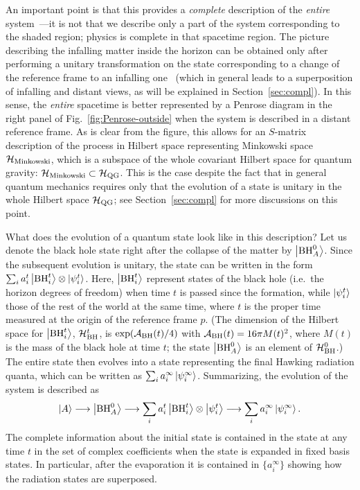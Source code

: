 \documentclass[12pt]{article}
\begin{document}
An important point is that this provides a {\it complete} description 
of the {\it entire} system~\cite{'tHooft:1990fr,Susskind:1993if}---it 
is not that we describe only a part of the system corresponding to 
the shaded region; physics is complete in that spacetime region.  The 
picture describing the infalling matter inside the horizon can be obtained 
only after performing a unitary transformation on the state corresponding 
to a change of the reference frame to an infalling one~\cite{Nomura:2011rb} 
(which in general leads to a superposition of infalling and distant views, 
as will be explained in Section~\ref{sec:compl}).  In this sense, the 
{\it entire} spacetime is better represented by a Penrose diagram in the 
right panel of Fig.~\ref{fig:Penrose-outside} when the system is described 
in a distant reference frame.  As is clear from the figure, this allows 
for an $S$-matrix description of the process in Hilbert space representing 
Minkowski space ${\cal H}_{\rm Minkowski}$, which is a subspace of the 
whole covariant Hilbert space for quantum gravity: ${\cal H}_{\rm Minkowski} 
\subset {\cal H}_{\rm QG}$.  This is the case despite the fact that 
in general quantum mechanics requires only that the evolution of a 
state is unitary in the whole Hilbert space ${\cal H}_{\rm QG}$; see 
Section~\ref{sec:compl} for more discussions on this point.

What does the evolution of a quantum state look like in this description? 
Let us denote the black hole state right after the collapse of the matter 
by $\left| {\rm BH}^0_A \right>$.  Since the subsequent evolution is unitary, 
the state can be written in the form $\sum_i a^t_i \left| {\rm BH}^t_i \right> 
\otimes \left| \psi^t_i \right>$.  Here, $\left| {\rm BH}^t_i \right>$ represent states 
of the black hole (i.e.\ the horizon degrees of freedom) when time $t$ 
is passed since the formation, while $\left| \psi^t_i \right>$ those of the rest 
of the world at the same time, where $t$ is the proper time measured 
at the origin of the reference frame $p$.  (The dimension of the 
Hilbert space for $\left| {\rm BH}^t_i \right>$, ${\cal H}_{\rm BH}^t$, is 
$\exp({\cal A}_{\rm BH}(t)/4)$ with ${\cal A}_{\rm BH}(t) = 16\pi M(t)^2$, 
where $M(t)$ is the mass of the black hole at time $t$; the state 
$\left| {\rm BH}^0_A \right>$ is an element of ${\cal H}_{\rm BH}^0$.) 
The entire state then evolves into a state representing the final 
Hawking radiation quanta, which can be written as $\sum_i a^\infty_i 
\left| \psi^\infty_i \right>$.  Summarizing, the evolution of the system is 
described as
%
\begin{equation}
  \ket{A} \longrightarrow \ket{{\rm BH}^0_A} 
    \longrightarrow \sum_i a^t_i \ket{{\rm BH}^t_i} \otimes \ket{\psi^t_i} 
    \longrightarrow \sum_i a^\infty_i \ket{\psi^\infty_i}.
\label{eq:BH-evol}
\end{equation}
%
The complete information about the initial state is contained in the 
state at any time $t$ in the set of complex coefficients when the state 
is expanded in fixed basis states.  In particular, after the evaporation 
it is contained in $\{ a^\infty_i \}$ showing how the radiation states 
are superposed.
\end{document}
